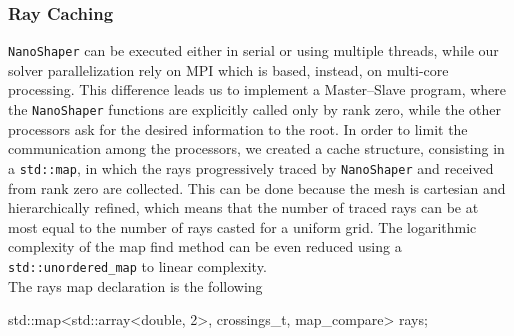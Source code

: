 \documentclass[11pt,a4paper]{article}
\begin{document}
\subsubsection{Ray Caching}
\texttt{NanoShaper} can be executed either in serial or using multiple threads, while our solver parallelization rely on MPI which is based, instead, on multi-core processing. This difference leads us to implement a Master--Slave program, where the \texttt{NanoShaper} functions are explicitly called only by rank zero, while the other processors ask for the desired information to the root. In order to limit the communication among the processors, we created a cache structure, consisting in a \texttt{std::map}, in which the rays progressively traced by \texttt{NanoShaper} and received from rank zero are collected. This can be done because the mesh is cartesian and hierarchically refined, which means that the number of traced rays can be at most equal to the number of rays casted for a uniform grid. The logarithmic complexity of the map find method can be even reduced using a \texttt{std::unordered\_map} to linear complexity. \\
The rays map declaration is the following

\begin{code}
std::map<std::array<double, 2>, crossings_t, map_compare> rays;         
\end{code}
\end{document}
